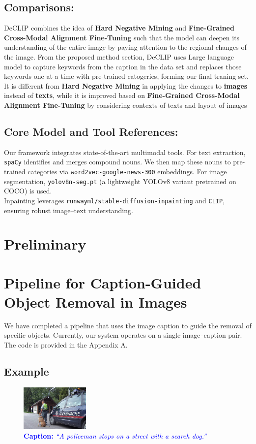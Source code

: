 \documentclass[11pt,letterpaper]{article}
\begin{document}
\subsection{Comparisons:}
DeCLIP combines the idea of \textbf{Hard Negative Mining} and \textbf{Fine-Grained Cross-Modal Alignment Fine-Tuning} such that the model can deepen its understanding of the entire image by paying attention to the regional changes of the image. From the proposed method section, DeCLIP uses Large language model to capture keywords from the caption in the data set and replaces those keywords one at a time with pre-trained catogeries, forming our final traning set. It is different from \textbf{Hard Negative Mining} in applying the changes to \textbf{images} instead of \textbf{texts}, while it is improved based on \textbf{Fine-Grained Cross-Modal Alignment Fine-Tuning} by considering contexts of texts and layout of images
\subsection{Core Model and Tool References:}
Our framework integrates state-of-the-art multimodal tools. For text extraction, \texttt{spaCy} \cite{spacy2025} identifies and merges compound nouns. We then map these nouns to pre-trained categories via \texttt{word2vec-google-news-300} embeddings. For image segmentation, \texttt{yolov8n-seg.pt} (a lightweight YOLOv8 variant pretrained on COCO) is used.\\ Inpainting leverages \texttt{runwayml/stable-diffusion-inpainting} and \texttt{CLIP}, ensuring robust image–text understanding.





\section{Preliminary}


\section*{Pipeline for Caption-Guided Object Removal in Images}

We have completed a pipeline that uses the image caption to guide the removal of specific objects. Currently, our system operates on a single image--caption pair. The code is provided in the Appendix A.

\subsection*{Example}
\noindent
   \begin{figure}[h]
    \centering
    \includegraphics[width=0.3\textwidth]{midterm_report/assets/oriIMG.jpg}
    \caption{\textcolor{blue}{\textbf{Caption:} \emph{``A policeman stops on a street with a search dog.''}}}
    \label{fig:original_image}
\end{figure}
\end{document}
